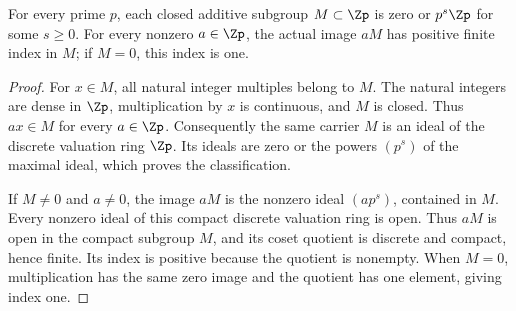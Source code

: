 \begin{lemma}
\label{ft:padic-closed-additive-subgroups}
\leanok
For every prime $p$, each closed additive subgroup $M\subset\Zp$ is
zero or $p^s\Zp$ for some $s\geq0$. For every nonzero $a\in\Zp$,
the actual image $aM$ has positive finite index in $M$; if $M=0$,
this index is one.
\end{lemma}
\begin{proof}
For $x\in M$, all natural integer multiples belong to $M$. The natural
integers are dense in $\Zp$, multiplication by $x$ is continuous, and
$M$ is closed. Thus $ax\in M$ for every $a\in\Zp$. Consequently the
same carrier $M$ is an ideal of the discrete valuation ring $\Zp$.
Its ideals are zero or the powers $(p^s)$ of the maximal ideal,
which proves the classification.

If $M\ne0$ and $a\ne0$, the image $aM$ is the nonzero ideal
$(ap^s)$, contained in $M$. Every nonzero ideal of this compact
discrete valuation ring is open. Thus $aM$ is open in the compact
subgroup $M$, and its coset quotient is discrete and compact, hence
finite. Its index is positive because the quotient is nonempty.
When $M=0$, multiplication has the same zero image and the quotient
has one element, giving index one.
\end{proof}

